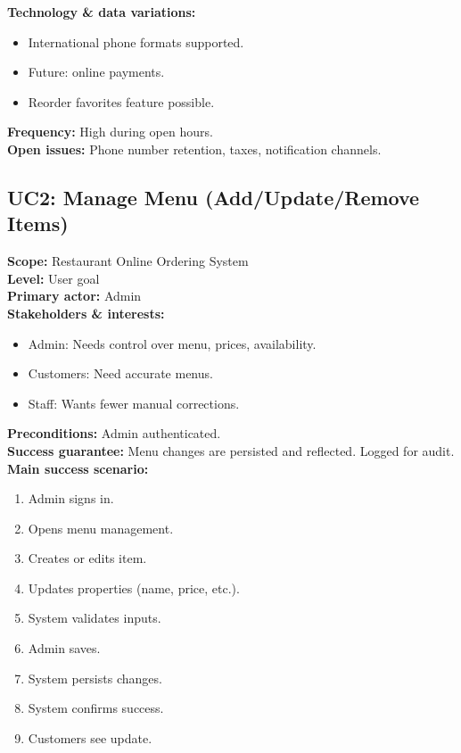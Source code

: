 \documentclass{article}
\begin{document}
\textbf{Technology \& data variations:}
\begin{itemize}
    \item International phone formats supported.
    \item Future: online payments.
    \item Reorder favorites feature possible.
\end{itemize}

\textbf{Frequency:} High during open hours.\\
\textbf{Open issues:} Phone number retention, taxes, notification channels.

\subsection*{UC2: Manage Menu (Add/Update/Remove Items)}
\textbf{Scope:} Restaurant Online Ordering System \\
\textbf{Level:} User goal \\
\textbf{Primary actor:} Admin \\

\textbf{Stakeholders \& interests:}
\begin{itemize}
    \item Admin: Needs control over menu, prices, availability.
    \item Customers: Need accurate menus.
    \item Staff: Wants fewer manual corrections.
\end{itemize}

\textbf{Preconditions:} Admin authenticated.\\
\textbf{Success guarantee:} Menu changes are persisted and reflected. Logged for audit.\\

\textbf{Main success scenario:}
\begin{enumerate}
    \item Admin signs in.
    \item Opens menu management.
    \item Creates or edits item.
    \item Updates properties (name, price, etc.).
    \item System validates inputs.
    \item Admin saves.
    \item System persists changes.
    \item System confirms success.
    \item Customers see update.
\end{enumerate}
\end{document}
